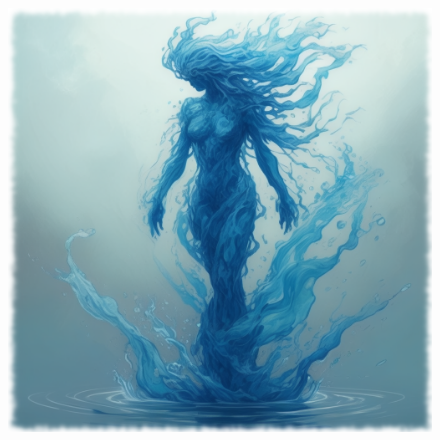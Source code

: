 \begin{figure}[h]
\begin{center}
\includegraphics[scale=0.24]{img/ai-images/water-elemental.png}
\end{center}
\end{figure}

